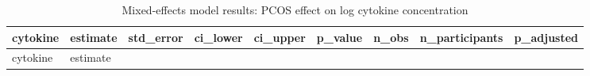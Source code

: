 \documentclass[
  letterpaper,
  DIV=11,
  numbers=noendperiod]{scrartcl}
\begin{document}
\begin{longtable}[]{@{}
  >{\raggedright\arraybackslash}p{}
  >{\raggedleft\arraybackslash}p{}
  >{\raggedleft\arraybackslash}p{}
  >{\raggedleft\arraybackslash}p{}
  >{\raggedleft\arraybackslash}p{}
  >{\raggedleft\arraybackslash}p{}
  >{\raggedleft\arraybackslash}p{}
  >{\raggedleft\arraybackslash}p{}
  >{\raggedleft\arraybackslash}p{}@{}}
\caption{Mixed-effects model results: PCOS effect on log cytokine
concentration}\tabularnewline
\toprule\noalign{}
\begin{minipage}[b]{\linewidth}\raggedright
cytokine
\end{minipage} & \begin{minipage}[b]{\linewidth}\raggedleft
estimate
\end{minipage} & \begin{minipage}[b]{\linewidth}\raggedleft
std\_error
\end{minipage} & \begin{minipage}[b]{\linewidth}\raggedleft
ci\_lower
\end{minipage} & \begin{minipage}[b]{\linewidth}\raggedleft
ci\_upper
\end{minipage} & \begin{minipage}[b]{\linewidth}\raggedleft
p\_value
\end{minipage} & \begin{minipage}[b]{\linewidth}\raggedleft
n\_obs
\end{minipage} & \begin{minipage}[b]{\linewidth}\raggedleft
n\_participants
\end{minipage} & \begin{minipage}[b]{\linewidth}\raggedleft
p\_adjusted
\end{minipage} \\
\midrule\noalign{}
\endfirsthead
\toprule\noalign{}
\begin{minipage}[b]{\linewidth}\raggedright
cytokine
\end{minipage} & \begin{minipage}[b]{\linewidth}\raggedleft
estimate
\end{minipage} & \begin{minipage}[b]{\linewidth}\raggedleft

\end{minipage}
\end{longtable}
\end{document}
